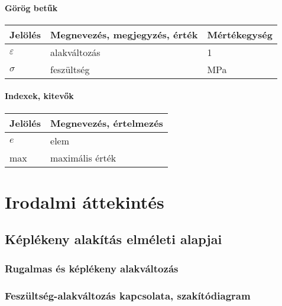\documentclass[12pt,a4paper,oneside]{report}
\begin{document}
\subsubsection*{Görög betűk}
\begin{center}
    \begin{tabular}{lp{10cm}l}
        \hline
        Jelölés & Megnevezés, megjegyzés, érték & Mértékegység \\
        \hline
                $\varepsilon$  & alakváltozás           & 1    \\
        $\sigma$  & feszültség                  & MPa             \\

        \hline
    \end{tabular}
\end{center}



\subsubsection*{Indexek, kitevők}
\begin{center}
    \begin{tabular}{lp{12.8cm}}
        \hline
        Jelölés & Megnevezés, értelmezés\\
        \hline
        $e$     & elem  \\
        max     & maximális érték        \\
        \hline
    \end{tabular}
\end{center}


\def\arraystretch{1}%

\cleardoublepage
{}
\chapter{Irodalmi áttekintés}

\section{Képlékeny alakítás elméleti alapjai}
\subsection{Rugalmas és képlékeny alakváltozás}
\subsection{Feszültség-alakváltozás kapcsolata, szakítódiagram}
\end{document}
